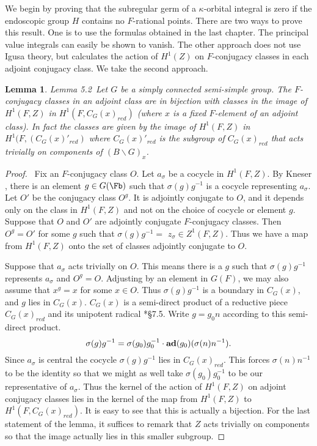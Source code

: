 \documentclass{memo-l}
\newtheorem{lemma}[theorem]{Lemma}
\theoremstyle{definition}
\theoremstyle{remark}
\numberwithin{section}{chapter}
\numberwithin{equation}{chapter}
\begin{document}
   We begin by proving that the subregular germ of a ${\kappa}$-orbital
integral is zero if the endoscopic group $H$ contains no $F$-rational
points.  There are two ways to prove this result.  One is to use the
formulas obtained in the last chapter.  The principal value integrals can
easily be shown to vanish.  The other approach does not use Igusa theory,
but calculates the action of $H^{1}(Z)$ on $F$-conjugacy classes in each
adjoint conjugacy class.  We take the second approach.

\medpagebreak

\addtocounter{theorem}{1} %

\begin{lemma}{Lemma 5.2}\ Let $G$ be a simply connected semi-simple group.
The $F$-conjugacy classes in an adjoint class are in bijection with
classes in the image of
$H^{1}(F,Z)$ in $H^{1}(F,C_{G}(x)_{red})$ (where $x$ is a fixed $F$-element
of an adjoint class).  In fact the classes are given
by the image of $H^{1}(F,Z)$ in $H^{1}(F,(C_{G}(x)'_{red})$ where
$C_{G}(x)'_{red}$ is the subgroup of $C_{G}(x)_{red}$ that acts trivially
on components of $(B\backslash G)_{x}$.
\end{lemma}


\begin{proof} \ Fix an $F$-conjugacy class $O$.  Let $a_{{\sigma}}$ be
a cocycle in $H^{1}(F,Z)$.  By Kneser \cites{MR0188219,MR0174559}, there is an element $g  \in
G(\Fb)$ such that ${\sigma}(g)g^{-1}$ is a cocycle representing
$a_{{\sigma}}$.  Let $O'$ be the conjugacy class $O^{g}$.  It is adjointly
conjugate to $O$, and it depends only on the class in $H^{1}(F,Z)$ and not
on the choice of cocycle or element $g$.  Suppose that $O$ and $O'$ are
adjointly conjugate $F$-conjugacy classes.  Then $O^{g} = O'$ for some $g$
such that ${\sigma}(g)g^{-1}  = $ $z_{{\sigma}}  \in  Z^{1}(F,Z)$.  Thus we
have a map from $H^{1}(F,Z)$ onto the set of classes adjointly
conjugate to $O$.

   Suppose that $a_{{\sigma}}$ acts trivially on $O$.  This means there is
a $g$ such that ${\sigma}(g)g^{-1}$ represents $a_{{\sigma}}$ and
$O^{g} = O$.  Adjusting by an element in $G(F)$, we may also assume that
$x^{g} = x$ for some $x  \in  O$.  Thus ${\sigma}(g)g^{-1}$ is a
boundary in $C_{G}(x)$, and $g$ lies in $C_{G}(x)$.  $C_{G}(x)$ is a
semi-direct product of a reductive piece $C_{G}(x)_{red}$ and its unipotent
radical \cite{MR584445}*{\S7.5}.  Write $g = g_{0}n$ according to this semi-direct
product.
$$
{\sigma}(g)g^{-1} = {\sigma}(g_{0})g_{0}^{-1}\cdot
{\bold {ad}}(g_{0})({\sigma}(n)n^{-1}).
$$
Since $a_{{\sigma}}$ is central the cocycle ${\sigma}(g)g^{-1}$ lies in
$C_{G}(x)_{red}$.  This forces ${\sigma}(n)n^{-1}$ to be the identity so
that we might as well take ${\sigma}(g_{0})g_{0}^{-1}$ to be our
representative of $a_{{\sigma}}$.  Thus the kernel of the action of
$H^{1}(F,Z)$ on adjoint conjugacy classes lies in the kernel of the map
from $H^{1}(F,Z)$ to $H^{1}(F,C_{G}(x)_{red})$.  It is easy to see that
this is actually a bijection.  For the last statement of the lemma, it
suffices to remark that $Z$ acts trivially on components so that the
image actually lies in this smaller subgroup.
\end{proof}
\end{document}

